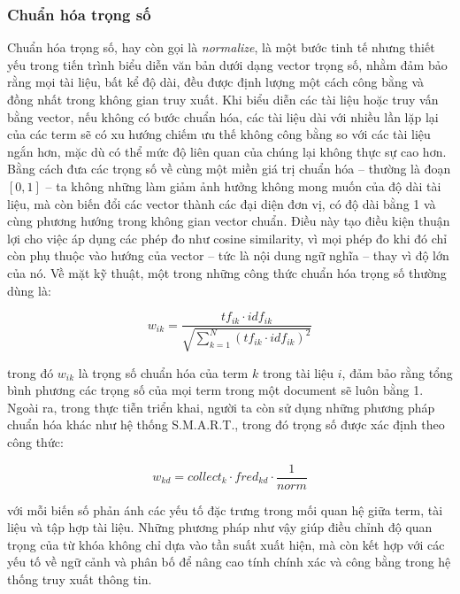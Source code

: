 \subsubsection{Chuẩn hóa trọng số}
Chuẩn hóa trọng số, hay còn gọi là \textit{normalize}, là một bước tinh tế nhưng thiết yếu trong tiến trình biểu diễn văn bản dưới dạng vector trọng số, nhằm đảm bảo rằng mọi tài liệu, bất kể độ dài, đều được định lượng một cách công bằng và đồng nhất trong không gian truy xuất. Khi biểu diễn các tài liệu hoặc truy vấn bằng vector, nếu không có bước chuẩn hóa, các tài liệu dài với nhiều lần lặp lại của các term sẽ có xu hướng chiếm ưu thế không công bằng so với các tài liệu ngắn hơn, mặc dù có thể mức độ liên quan của chúng lại không thực sự cao hơn. Bằng cách đưa các trọng số về cùng một miền giá trị chuẩn hóa -- thường là đoạn \([0, 1]\) -- ta không những làm giảm ảnh hưởng không mong muốn của độ dài tài liệu, mà còn biến đổi các vector thành các đại diện đơn vị, có độ dài bằng 1 và cùng phương hướng trong không gian vector chuẩn. Điều này tạo điều kiện thuận lợi cho việc áp dụng các phép đo như cosine similarity, vì mọi phép đo khi đó chỉ còn phụ thuộc vào hướng của vector -- tức là nội dung ngữ nghĩa -- thay vì độ lớn của nó. Về mặt kỹ thuật, một trong những công thức chuẩn hóa trọng số thường dùng là:

\begin{equation}
    w_{ik} = \frac{tf_{ik} \cdot idf_{ik}}{\sqrt{\sum_{k=1}^{N} (tf_{ik} \cdot idf_{ik})^2}}
\end{equation}

trong đó \(w_{ik}\) là trọng số chuẩn hóa của term \(k\) trong tài liệu \(i\), đảm bảo rằng tổng bình phương các trọng số của mọi term trong một document sẽ luôn bằng 1. Ngoài ra, trong thực tiễn triển khai, người ta còn sử dụng những phương pháp chuẩn hóa khác như hệ thống S.M.A.R.T., trong đó trọng số được xác định theo công thức:

\begin{equation}
    w_{kd} = collect_k \cdot fred_{kd} \cdot \frac{1}{norm}
\end{equation}

với mỗi biến số phản ánh các yếu tố đặc trưng trong mối quan hệ giữa term, tài liệu và tập hợp tài liệu. Những phương pháp như vậy giúp điều chỉnh độ quan trọng của từ khóa không chỉ dựa vào tần suất xuất hiện, mà còn kết hợp với các yếu tố về ngữ cảnh và phân bố để nâng cao tính chính xác và công bằng trong hệ thống truy xuất thông tin.
